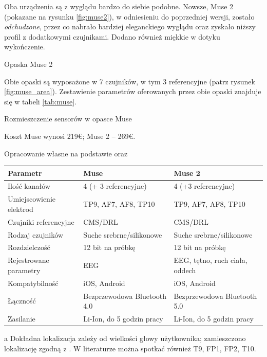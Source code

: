 \documentclass[skorowidz,skroty]{dyplomWEZUT}
\begin{document}
Oba urządzenia są z wyglądu bardzo do siebie podobne. Nowsze, Muse 2 (pokazane na rysunku \vref{fig:muse2}), w odniesieniu do poprzedniej wersji, zostało \textit{odchudzone}, przez co nabrało bardziej eleganckiego wyglądu oraz zyskało niższy profil z dodatkowymi czujnikami\cite{muse_comparison_article}. Dodano również miękkie w dotyku wykończenie.

\FloatBarrier
{}
{Opaska Muse 2\label{fig:muse2}}
{\cite{muse2}}
  
Obie opaski są wyposażone w 7 czujników, w tym 3 referencyjne (patrz rysunek \vref{fig:muse_area}). Zestawienie parametrów oferowanych przez obie opaski znajduje się w tabeli \vref{tab:muse}.

{Rozmieszczenie sensorów w opasce Muse\label{fig:muse_area}}
{\cite{muse_specification}}

Koszt Muse wynosi 219€; Muse 2 -- 269€.

{Opracowanie własne na podstawie \cite{muse_comparison} oraz \cite{muse_specification}}
{
    \begin{threeparttable}
        \begin{tabular}{l|l|l}
            Parametr & Muse & Muse 2 \\\hline\hline
            Ilość kanałów & 4 (+ 3 referencyjne) & 4 (+3 referencyjne)\\
            Umiejscowienie elektrod & TP9, AF7, AF8, TP10\tnote{a} & TP9, AF7, AF8, TP10\tnote{a} \\
            Czujniki referencyjne & CMS/DRL & CMS/DRL \\
            Rodzaj czujników & Suche srebrne/silikonowe & Suche srebrne/silikonowe \\
            Rozdzielczość & 12 bit na próbkę & 12 bit na próbkę \\
            Rejestrowane parametry & EEG & EEG, tętno, ruch ciała, oddech \\
            Kompatybilność & iOS, Android & iOS, Android \\
            Łączność & Bezprzewodowa Bluetooth 4.0 & Bezprzewodowa Bluetooth 5.0 \\
            Zasilanie & Li-Ion, do 5 godzin pracy & Li-Ion, do 5 godzin pracy \\
        \end{tabular}
        \begin{tablenotes}
            \item[a] \footnotesize Dokładna lokalizacja zależy od wielkości głowy użytkownika; zamieszczono lokalizację zgodną z \cite{muse_specification}. W literaturze można spotkać również T9, FP1, FP2, T10\cite{muse_article}.
        \end{tablenotes}
    \end{threeparttable}
}
\end{document}
